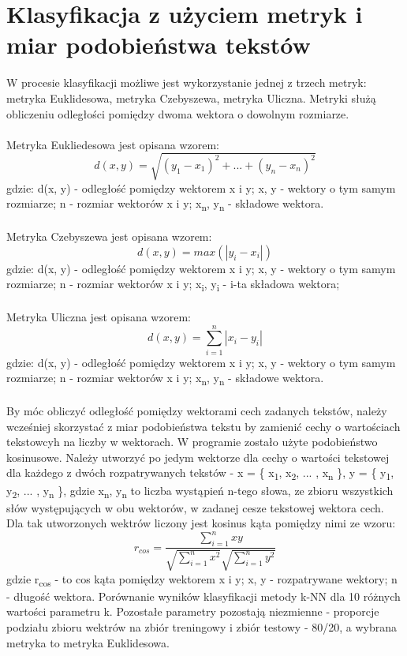 \documentclass{classrep}
\begin{document}
\section{Klasyfikacja z użyciem metryk i miar podobieństwa tekstów}
W procesie klasyfikacji możliwe jest wykorzystanie jednej z trzech metryk: metryka Euklidesowa, metryka Czebyszewa, metryka Uliczna. Metryki służą obliczeniu odległości pomiędzy dwoma wektora o dowolnym rozmiarze.\\\\ Metryka Eukliedesowa\cite{dane} jest opisana wzorem: 
\begin{equation} d(x, y) = \sqrt{(y_1 - x_1)^2 + ... + (y_n - x_n)^2}  \end{equation}
gdzie: d(x, y) - odległość pomiędzy wektorem x i y; x, y - wektory o tym samym rozmiarze; n - rozmiar wektorów x i y;  x\textsubscript{n}, y\textsubscript{n} - składowe wektora. 
\\\\
Metryka Czebyszewa\cite{dane} jest opisana wzorem: 
\begin{equation} d(x, y) = max(|y_i - x_i|) \end{equation}
gdzie: d(x, y) - odległość pomiędzy wektorem x i y; x, y - wektory o tym samym rozmiarze; n - rozmiar wektorów x i y;  x\textsubscript{i}, y\textsubscript{i} - i-ta składowa wektora;
\\\\
Metryka Uliczna\cite{dane} jest opisana wzorem: 
\begin{equation} d(x, y) = \sum_{i = 1}^{n} |x_i - y_i| \end{equation}
gdzie: d(x, y) - odległość pomiędzy wektorem x i y; x, y - wektory o tym samym rozmiarze; n - rozmiar wektorów x i y;  x\textsubscript{n}, y\textsubscript{n} - składowe wektora. 
\\\\
By móc obliczyć odległość pomiędzy wektorami cech zadanych tekstów, należy wcześniej skorzystać z miar podobieństwa tekstu by zamienić cechy o wartościach tekstowcyh na liczby w wektorach. W programie zostało użyte podobieństwo kosinusowe\cite{wyklad}. Należy utworzyć po jedym wektorze dla cechy o wartości tekstowej dla każdego z dwóch rozpatrywanych tekstów - x = \{ x\textsubscript{1}, x\textsubscript{2}, ... , x\textsubscript{n} \},  y = \{ y\textsubscript{1}, y\textsubscript{2}, ... , y\textsubscript{n} \}, gdzie x\textsubscript{n}, y\textsubscript{n}  to liczba wystąpień n-tego słowa, ze zbioru wszystkich słów występujących w obu wektorów, w zadanej cesze tekstowej wektora cech. Dla tak utworzonych wektrów liczony jest kosinus kąta pomiędzy nimi ze wzoru:
\begin{equation} r_{cos} = \frac{\sum_{i = 1}^{n} x y}{\sqrt{\sum_{i = 1}^{n} x^2}\sqrt{\sum_{i = 1}^{n} y^2}} \end{equation}
gdzie r\textsubscript{cos} - to cos kąta pomiędzy wektorem x i y; x, y - rozpatrywane wektory; n - długość wektora.
\newline
Porównanie wyników klasyfikacji metody k-NN dla 10 różnych wartości parametru k. Pozostałe parametry pozostają niezmienne - proporcje podziału zbioru wektrów na zbiór treningowy i zbiór testowy - 80/20, a wybrana metryka to metryka Euklidesowa. 
\end{document}
